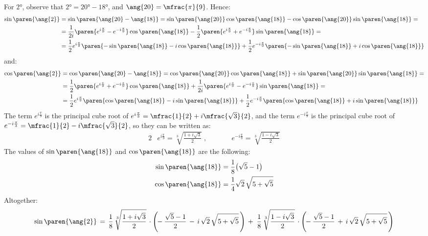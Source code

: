 For $\ang{2}$, observe that
$\ang{2} = \ang{20} - \ang{18}$,
and $\ang{20} = \mfrac{\pi}{9}$.
Hence:
\begin{align*}
 \sin\paren{\ang{2}}
 &= \sin\paren{\ang{20} - \ang{18}}
  = \sin\paren{\ang{20}} \cos\paren{\ang{18}}
    - \cos\paren{\ang{20}} \sin\paren{\ang{18}} = \\
 &= \frac{1}{2 i}
    \paren{e^{i \frac{\pi}{9}} - e^{ -i \frac{\pi}{9}}}
    \cos\paren{\ang{18}}
    - \frac{1}{2}
    \paren{e^{i \frac{\pi}{9}} + e^{ -i \frac{\pi}{9}}}
    \sin\paren{\ang{18}} = \\
 &= \frac{1}{2}
    e^{i \frac{\pi}{9}}
    \paren{ - \sin\paren{\ang{18}} - i \cos\paren{\ang{18}}}
    + \frac{1}{2}
    e^{ -i \frac{\pi}{9}}
    \paren{ - \sin\paren{\ang{18}} + i \cos\paren{\ang{18}}}
\end{align*}
and:
\begin{align*}
 \cos\paren{\ang{2}}
 &= \cos\paren{\ang{20} - \ang{18}}
  = \cos\paren{\ang{20}} \cos\paren{\ang{18}}
    + \sin\paren{\ang{20}} \sin\paren{\ang{18}} = \\
 &= \frac{1}{2}
    \paren{e^{i \frac{\pi}{9}} + e^{ -i \frac{\pi}{9}}}
    \cos\paren{\ang{18}}
    + \frac{1}{2 i}
    \paren{e^{i \frac{\pi}{9}} - e^{ -i \frac{\pi}{9}}}
    \sin\paren{\ang{18}} = \\
 &= \frac{1}{2}
    e^{i \frac{\pi}{9}}
    \paren{\cos\paren{\ang{18}} - i \sin\paren{\ang{18}}}
    + \frac{1}{2}
    e^{ -i \frac{\pi}{9}}
    \paren{\cos\paren{\ang{18}} + i \sin\paren{\ang{18}}}
\end{align*}
The term $e^{i \frac{\pi}{9}}$
is the principal cube root of
$e^{i \frac{\pi}{3}} = \mfrac{1}{2} + i \mfrac{\sqrt{3}}{2}$,
and the term $e^{- i \frac{\pi}{9}}$
is the principal cube root of
$e^{- i \frac{\pi}{3}} = \mfrac{1}{2} - i \mfrac{\sqrt{3}}{2}$,
so they can be written as:
\begin{alignat*}{2}
 & e^{i \frac{\pi}{9}}
 = \sqrt[3]{\frac{1 + i \sqrt{3}}{2}} \; , && \qquad
 e^{- i \frac{\pi}{9}}
 = \sqrt[3]{\frac{1 - i \sqrt{3}}{2}}
\end{alignat*}
The values of $\sin\paren{\ang{18}}$ and $\cos\paren{\ang{18}}$ are the following:
\begin{align*}
 \sin\paren{\ang{18}}
 &= \frac{1}{8} \big(\sqrt{5} - 1 \big)
 \\
 \cos\paren{\ang{18}}
 &= \frac{1}{4} \sqrt{2} \, \sqrt{5 + \sqrt{5}}
\end{align*}
Altogether:
\begin{equation*}
 \sin\paren{\ang{2}}
 \, = \, \frac{1}{8} \, \sqrt[3]{\frac{1 + i \sqrt{3}}{2}}
   \, \cdot
   \Bigg( \!\!
     - \frac{\sqrt{5} - 1}{2}
     \, - \, i \, \sqrt{2} \, \sqrt{5 + \sqrt{5}} \,
   \Bigg)
 \, + \;
   \frac{1}{8} \, \sqrt[3]{\frac{1 - i \sqrt{3}}{2}}
   \, \cdot
   \Bigg( \!\!
     - \frac{\sqrt{5} - 1}{2}
     \, + \, i \, \sqrt{2} \, \sqrt{5 + \sqrt{5}} \,
   \Bigg)
\end{equation*}
